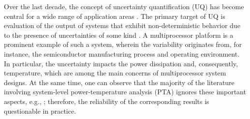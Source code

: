Over the last decade, the concept of uncertainty quantification (UQ) has become central for a wide range of application areas \cite{xiu2010}. The primary target of UQ is evaluation of the output of systems that exhibit non-deterministic behavior due to the presence of uncertainties of some kind \cite{eldred2009}. A multiprocessor platform is a prominent example of such a system, wherein the variability originates from, for instance, the semiconductor manufacturing process and operating environment. In particular, the uncertainty impacts the power dissipation and, consequently, temperature, which are among the main concerns of multiprocessor system designs. At the same time, one can observe that the majority of the literature involving system-level power-temperature analysis (PTA) ignores these important aspects, e.g., \cite{rao2009, liu2010, rai2011, thiele2011, ukhov2012}; therefore, the reliability of the corresponding results is questionable in practice.

